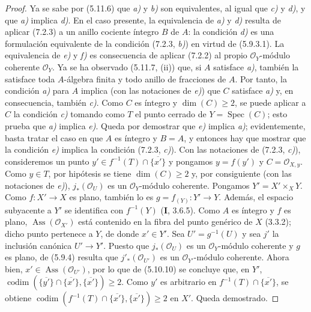 \begin{proof}
Ya se sabe por (5.11.6) que \emph{a)} y \emph{b)} son equivalentes, al igual que
\emph{c)} y \emph{d)}, y que \emph{a)} implica \emph{d)}. En el caso presente, la equivalencia
de \emph{a)} y \emph{d)} resulta de aplicar (7.2.3) a un anillo cociente íntegro
$B$ de $A$: la condición \emph{d)} es una formulación equivalente de la
condición (7.2.3, \emph{b)}) en virtud de (5.9.3.1). La equivalencia de \emph{e)}
y \emph{f)} es consecuencia de aplicar (7.2.2) al propio
$\mathscr O_Y$-módulo coherente $\mathscr O_Y$. Ya se ha observado
(5.11.7, (ii)) que, si $A$ satisface \emph{a)}, también la satisface toda
$A$-álgebra finita y todo anillo de fracciones de $A$. Por tanto,
la condición \emph{a)} para $A$ implica (con las notaciones de \emph{e)}) que
$C$ satisface \emph{a)} y, en consecuencia, también \emph{c)}. Como $C$ es
íntegro y $\dim(C)\geqslant
2$, se puede aplicar a $C$ la condición
\emph{c)} tomando como $T$ el punto cerrado de $Y=\operatorname{Spec}(C)$;
esto prueba que \emph{a)} implica \emph{e)}. Queda por demostrar que \emph{e)}
implica \emph{a)}; evidentemente, basta tratar el caso en que $A$ es íntegro y $B=A$,
y entonces hay que mostrar que la condición \emph{e)} implica la condición
(7.2.3, \emph{c)}). Con las notaciones de (7.2.3, \emph{c)}), consideremos un punto
$y'\in f^{-1}(T)\cap\overline{\{x'\}}$ y pongamos $y=f(y')$
y $C=\mathscr O_{X,y}$. Como $y\in T$, por hipótesis se tiene
$\dim(C)\geqslant2$ y, por consiguiente (con las notaciones de \emph{e)}),
$j_*(\mathscr O_U)$ es un $\mathscr O_Y$-módulo coherente. Pongamos
$Y'=X'\times_XY$. Como $f:X'\to X$ es plano, también lo es
$g=f_{(Y)}:Y'\to Y$. Además, el espacio subyacente a $Y'$ se
identifica con $f^{-1}(Y)$ (\textbf I, 3.6.5). Como $A$ es íntegro y $f$
es plano, $\operatorname{Ass}(\mathscr O_{X'})$ está contenido en
la fibra del punto genérico de $X$ (3.3.2); dicho punto pertenece
a $Y$, de donde $x'\in Y'$. Sea $U'=g^{-1}(U)$ y sea $j'$ la
inclusión canónica $U'\to Y'$. Puesto que
$j_*(\mathscr O_U)$ es un $\mathscr O_Y$-módulo coherente y $g$
es plano, de (5.9.4) resulta que $j'_*(\mathscr O_{U'})$ es un
$\mathscr O_{Y'}$-módulo coherente. Ahora bien,
$x'\in\operatorname{Ass}(\mathscr O_{U'})$, por lo que de
(5.10.10) se concluye que, en $Y'$,
$\operatorname{codim}(\overline{\{y'\}}\cap\overline{\{x'\}},
\overline{\{x'\}})\geqslant2$.
Como $y'$ es arbitrario en
$f^{-1}(T)\cap\overline{\{x'\}}$, se obtiene
$\operatorname{codim}(f^{-1}(T)\cap\overline{\{x'\}},
\overline{\{x'\}})\geqslant2$ en $X'$. Queda demostrado.
\end{proof}
